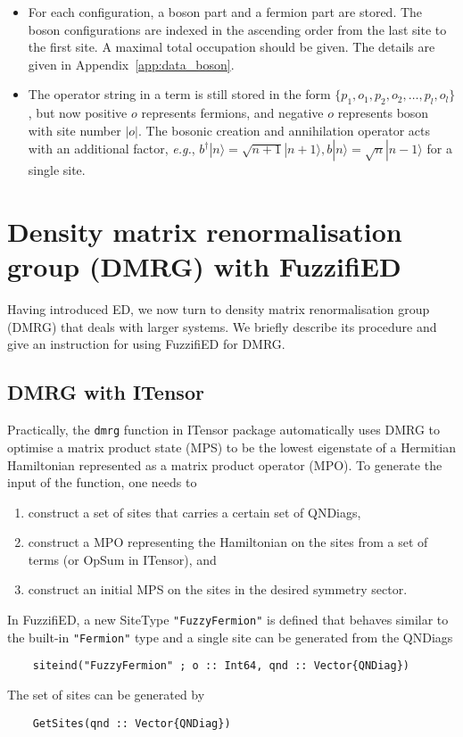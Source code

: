 \documentclass{timesjhep}
\begin{document}
\begin{itemize}
    \item For each configuration, a boson part and a fermion part are stored. The boson configurations are indexed in the ascending order from the last site to the first site. A maximal total occupation should be given. The details are given in Appendix~\ref{app:data_boson}.
    \item The operator string in a term is still stored in the form $\{p_1,o_1,p_2,o_2,\dots,p_l,o_l\}$, but now positive $o$ represents fermions, and negative $o$ represents boson with site number $|o|$. The bosonic creation and annihilation operator acts with an additional factor, \textit{e.g.}, $b^\dagger|n\rangle=\sqrt{n+1}|n+1\rangle,b|n\rangle=\sqrt{n}|n-1\rangle$ for a single site.
\end{itemize}

\section{Density matrix renormalisation group (DMRG) with FuzzifiED}
\label{sec:dmrg}

Having introduced ED, we now turn to density matrix renormalisation group (DMRG) that deals with larger systems. We briefly describe its procedure  and give an instruction for using FuzzifiED for DMRG. 

\subsection{DMRG with ITensor}

Practically, the \lstinline|dmrg| function in ITensor package automatically uses DMRG to optimise a matrix product state (MPS) to be the lowest eigenstate of a Hermitian Hamiltonian represented as a matrix product operator (MPO). To generate the input of the function, one needs to 
\begin{enumerate}
    \item construct a set of sites that carries a certain set of QNDiags,
    \item construct a MPO representing the Hamiltonian on the sites from a set of terms (or OpSum in ITensor), and 
    \item construct an initial MPS on the sites in the desired symmetry sector.
\end{enumerate}

In FuzzifiED, a new SiteType \lstinline|"FuzzyFermion"| is defined that behaves similar to the built-in \lstinline|"Fermion"| type and a single site can be generated from the QNDiags
\begin{lstlisting}
    siteind("FuzzyFermion" ; o :: Int64, qnd :: Vector{QNDiag})
\end{lstlisting}
The set of sites can be generated by 
\begin{lstlisting}
    GetSites(qnd :: Vector{QNDiag})
\end{lstlisting}
\end{document}
